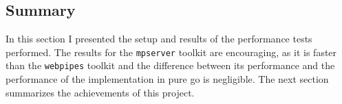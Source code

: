 \subsection{Summary}
In this section I presented the setup and results of the performance tests performed.
The results for the \texttt{mpserver} toolkit are encouraging, as it is faster than
the \texttt{webpipes} toolkit and the difference between its performance and the performance
of the implementation in pure go is negligible. The next section summarizes the achievements 
of this project.